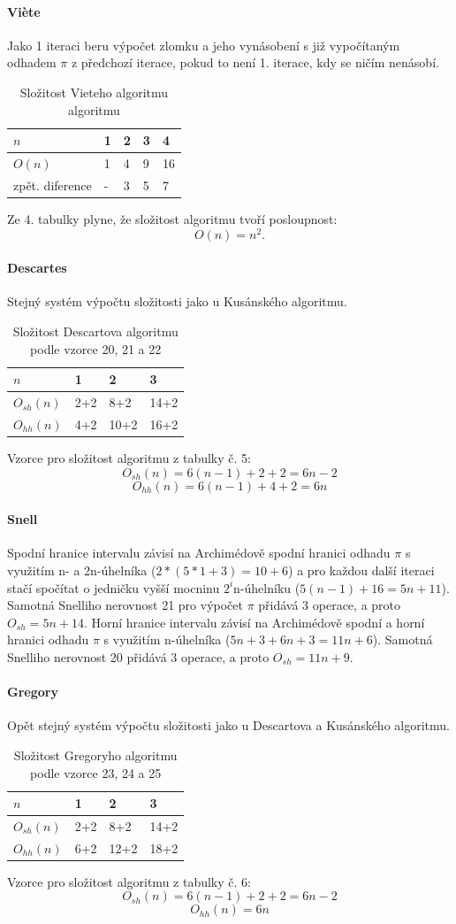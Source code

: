 \documentclass[rocnikovka]{gzwroc} %
\begin{document}
\paragraph{Viète}
Jako 1 iteraci beru výpočet zlomku a jeho vynásobení s již vypočítaným odhadem $\pi$ z předchozí iterace, pokud to není 1. iterace, kdy se ničím nenásobí.
\begin{table}[h!]
\caption{Složitost Vieteho algoritmu algoritmu}
\begin{tabular}{|l||l|l|l|l|}
\hline
$n$ & 1&2&3&4 \\ \hline
$O(n)$&1&4&9&16 \\ \hline
zpět. diference&-&3&5&7 \\ \hline
\end{tabular}
\end{table}
Ze 4. tabulky plyne, že složitost algoritmu tvoří posloupnost:
$$
O(n)=n^2.
$$
\paragraph{Descartes}
Stejný systém výpočtu složitosti jako u Kusánského algoritmu.
\begin{table}[h!]
\caption{Složitost Descartova algoritmu podle vzorce 20, 21 a 22}
\begin{tabular}{|l||l|l|l|}
\hline
$n$ & 1&2&3 \\ \hline
$O_{sh}(n)$&2+2&8+2&14+2 \\ \hline
$O_{hh}(n)$&4+2&10+2&16+2 \\ \hline
\end{tabular}
\end{table}
Vzorce pro složitost algoritmu z tabulky č. 5:
$$
O_{sh}(n)=6(n-1)+2+2=6n-2
$$
$$
O_{hh}(n)=6(n-1)+4+2=6n
$$
\paragraph{Snell}
Spodní hranice intervalu závisí na Archimédově spodní hranici odhadu $\pi$ s využitím n- a 
2n-úhelníka ($2*(5*1+3)=10+6$) a pro každou další iteraci stačí spočítat o jedničku vyšší mocninu $2^i$n-úhelníku ($5(n-1)+16=5n+11$). Samotná Snelliho nerovnost 21 pro výpočet $\pi$ přidává 3 operace, a proto $O_{sh}=5n+14$.
Horní hranice intervalu závisí na Archimédově spodní a horní hranici odhadu $\pi$ s využitím n-úhelníka ($5n+3+6n+3=11n+6$). Samotná Snelliho nerovnost 20 přidává 3 operace, a proto $O_{sh}=11n+9$.
\paragraph{Gregory}
Opět stejný systém výpočtu složitosti jako u Descartova a  Kusánského algoritmu.
\begin{table}[h!]
\caption{Složitost Gregoryho algoritmu podle vzorce 23, 24 a 25}
\begin{tabular}{|l||l|l|l|}
\hline
$n$ & 1&2&3 \\ \hline
$O_{sh}(n)$&2+2&8+2&14+2 \\ \hline
$O_{hh}(n)$&6+2&12+2&18+2 \\ \hline
\end{tabular}
\end{table}
Vzorce pro složitost algoritmu z tabulky č. 6:
$$
O_{sh}(n)=6(n-1)+2+2=6n-2
$$
$$
O_{hh}(n)=6n
$$
\end{document}
